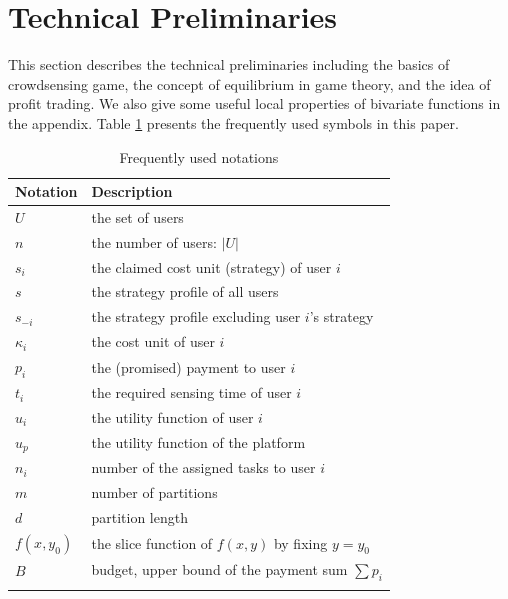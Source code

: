 \documentclass[conference]{IEEEtran}
\theoremstyle{definition}
\begin{document}
\section{Technical Preliminaries}
\label{sec:TP}
This section describes the technical preliminaries including the basics of crowdsensing game, the concept of equilibrium in game theory, and the idea of profit trading. We also give some useful local properties of bivariate functions in the appendix. Table \ref{tab:symbol_list} presents the frequently used symbols in this paper.
\begin{table}[!t]
\begin{tabular}{l l}
\toprule
Notation & Description\\
\hline
$U$ & the set of users\\
$n$ & the number of users: $|U|$ \\
$s_i$ & the claimed cost unit (strategy) of user $i$\\
$s$ & the strategy profile of all users \footnotemark[1]\\
$s_{-i}$ & the strategy profile excluding user $i$'s strategy\\
$\kappa_i$ & the cost unit of user $i$\\
$p_i$ & the (promised) payment to user $i$\\
$t_i$ & the required sensing time of user $i$\\
$u_i$ & the utility function of user $i$\\
$u_p$ & the utility function of the platform\\
$n_i$ & number of the assigned tasks to user $i$\\
$m$	& number of partitions\\
$d$ & partition length\\
$f(x, y_0)$ & the slice function of $f(x,y)$ by fixing $y = y_0$\\
$B$ & budget, upper bound of the payment sum $\sum p_i$\\
\bottomrule
\smallskip
\end{tabular}
\caption{Frequently used notations}
\label{tab:symbol_list}
\end{table}
\addtocounter{footnote}{1}
\end{document}
